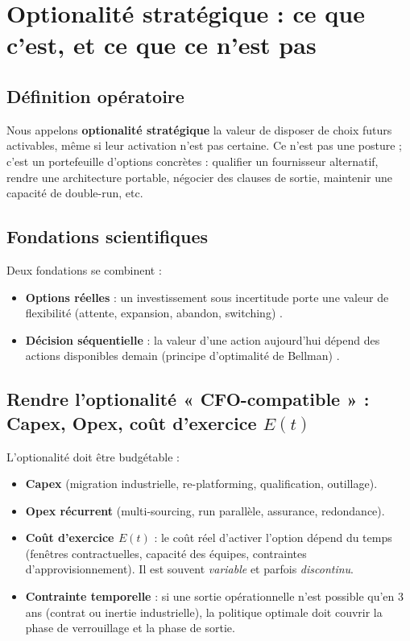\documentclass[11pt,a4paper]{article}
\begin{document}
\section{Optionalité stratégique : ce que c’est, et ce que ce n’est pas}

\subsection{Définition opératoire}
Nous appelons \textbf{optionalité stratégique} la valeur de disposer de choix futurs activables, même si leur activation n’est pas certaine.
Ce n’est pas une posture ; c’est un portefeuille d’options concrètes : qualifier un fournisseur alternatif, rendre une architecture portable, négocier des clauses de sortie, maintenir une capacité de double-run, etc.

\subsection{Fondations scientifiques}
Deux fondations se combinent :
\begin{itemize}
\item \textbf{Options réelles} : un investissement sous incertitude porte une valeur de flexibilité (attente, expansion, abandon, switching) \citep{dixitpindyck1994}.
\item \textbf{Décision séquentielle} : la valeur d’une action aujourd’hui dépend des actions disponibles demain (principe d’optimalité de Bellman) \citep{bellman1957}.
\end{itemize}

\subsection{Rendre l’optionalité « CFO-compatible » : Capex, Opex, coût d’exercice \(E(t)\)}
L’optionalité doit être budgétable :
\begin{itemize}
\item \textbf{Capex} (migration industrielle, re-platforming, qualification, outillage).
\item \textbf{Opex récurrent} (multi-sourcing, run parallèle, assurance, redondance).
\item \textbf{Coût d’exercice \(E(t)\)} : le coût réel d’activer l’option dépend du temps (fenêtres contractuelles, capacité des équipes, contraintes d’approvisionnement). Il est souvent \emph{variable} et parfois \emph{discontinu}.
\item \textbf{Contrainte temporelle} : si une sortie opérationnelle n’est possible qu’en 3 ans (contrat ou inertie industrielle), la politique optimale doit couvrir la phase de verrouillage et la phase de sortie.
\end{itemize}
\end{document}
